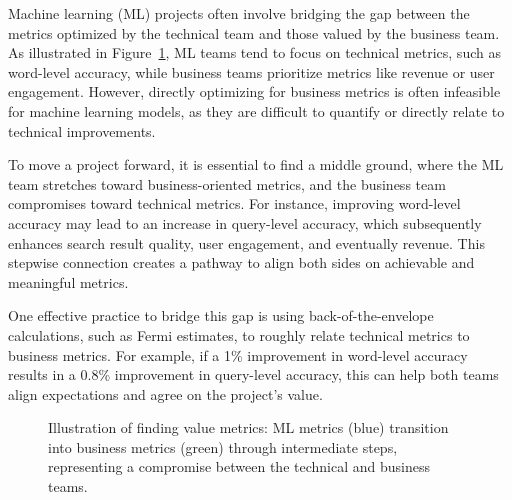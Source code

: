 \documentclass[12pt,openany]{book}
\begin{document}
Machine learning (ML) projects often involve bridging the gap between the metrics optimized by the technical team and those valued by the business team. As illustrated in Figure~\ref{fig:value_metrics}, ML teams tend to focus on technical metrics, such as word-level accuracy, while business teams prioritize metrics like revenue or user engagement. However, directly optimizing for business metrics is often infeasible for machine learning models, as they are difficult to quantify or directly relate to technical improvements. \newline

To move a project forward, it is essential to find a middle ground, where the ML team stretches toward business-oriented metrics, and the business team compromises toward technical metrics. For instance, improving word-level accuracy may lead to an increase in query-level accuracy, which subsequently enhances search result quality, user engagement, and eventually revenue. This stepwise connection creates a pathway to align both sides on achievable and meaningful metrics. \newline

One effective practice to bridge this gap is using back-of-the-envelope calculations, such as Fermi estimates, to roughly relate technical metrics to business metrics. For example, if a 1\% improvement in word-level accuracy results in a 0.8\% improvement in query-level accuracy, this can help both teams align expectations and agree on the project’s value.

\begin{figure}[H]
    \centering
    \caption{Illustration of finding value metrics: ML metrics (blue) transition into business metrics (green) through intermediate steps, representing a compromise between the technical and business teams.}
    \label{fig:value_metrics}
\end{figure}
\end{document}
